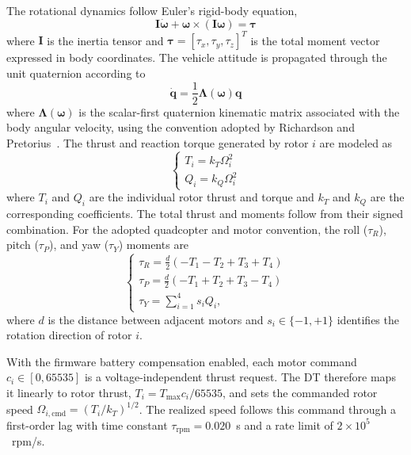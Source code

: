 \documentclass[journal]{IEEEtran}
\begin{document}
The rotational dynamics follow Euler's rigid-body equation,
%
\begin{equation}
\mathbf{I}\dot{\boldsymbol{\omega}}
+
\boldsymbol{\omega}
\times
(\mathbf{I}\boldsymbol{\omega})
= \boldsymbol{\tau}
\label{eq_vehicle_rot}
\end{equation}
where $\mathbf{I}$ is the inertia tensor and $\boldsymbol{\tau}=[\tau_x,\tau_y,\tau_z]^T$ is the total moment vector expressed in body coordinates.
%
The vehicle attitude is propagated through the unit quaternion according to
%
\begin{equation}
\dot{\mathbf q} = \frac{1}{2}
\mathbf{\Lambda}(\boldsymbol{\omega})\mathbf q
\label{eq_vehicle_attitude}
\end{equation}
where $\mathbf{\Lambda}(\boldsymbol{\omega})$ is the scalar-first quaternion kinematic matrix associated with the body angular velocity, using the convention adopted by Richardson and Pretorius~\cite{Richardson2025}.
%
The thrust and reaction torque generated by rotor $i$ are modeled as
%
\begin{equation}
\begin{cases}
{T_i=k_T\Omega_i^2}\\
{Q_i=k_Q\Omega_i^2}
\end{cases}
\label{eq_T_and_Q}
\end{equation}
where $T_i$ and $Q_i$ are the individual rotor thrust and torque and $k_T$ and $k_Q$ are the corresponding coefficients. The total thrust and moments follow from their signed combination.
%
For the adopted quadcopter and motor convention, the roll ($\tau_R$), pitch ($\tau_P$), and yaw ($\tau_Y$) moments are
%
\begin{equation}
\begin{cases}
{\tau_R=
\frac{d}{2}
\left(
-T_1-T_2+T_3+T_4
\right)}\\
{\tau_P=
\frac{d}{2}
\left(
-T_1+T_2+T_3-T_4
\right)}\\
{\tau_Y=
\sum_{i=1}^{4}s_iQ_i,}
\end{cases}
\label{eq_RP_moments}
\end{equation}
where $d$ is the distance between adjacent motors and $s_i\in\{-1,+1\}$ identifies the rotation direction of rotor $i$.
%

With the firmware battery compensation enabled, each motor command $c_i\in[0,65535]$ is a voltage-independent thrust request. The DT therefore maps it linearly to rotor thrust, $T_i=T_{\max}c_i/65535$, and sets the commanded rotor speed $\Omega_{i,\mathrm{cmd}}=(T_i/k_T)^{1/2}$. The realized speed follows this command through a first-order lag with time constant $\tau_{\mathrm{rpm}}=0.020$~s and a rate limit of $2\times10^5$~rpm/s.
\end{document}
